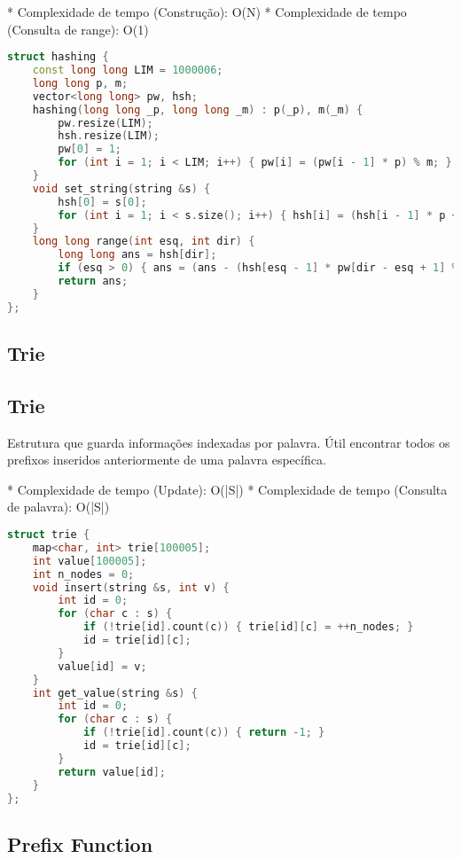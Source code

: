 \documentclass[11pt, a4paper, twoside]{article}
\begin{document}
* Complexidade de tempo (Construção): O(N)
* Complexidade de tempo (Consulta de range): O(1)

\begin{lstlisting}[language=C++]
struct hashing {
    const long long LIM = 1000006;
    long long p, m;
    vector<long long> pw, hsh;
    hashing(long long _p, long long _m) : p(_p), m(_m) {
        pw.resize(LIM);
        hsh.resize(LIM);
        pw[0] = 1;
        for (int i = 1; i < LIM; i++) { pw[i] = (pw[i - 1] * p) % m; }
    }
    void set_string(string &s) {
        hsh[0] = s[0];
        for (int i = 1; i < s.size(); i++) { hsh[i] = (hsh[i - 1] * p + s[i]) % m; }
    }
    long long range(int esq, int dir) {
        long long ans = hsh[dir];
        if (esq > 0) { ans = (ans - (hsh[esq - 1] * pw[dir - esq + 1] % m) + m) % m; }
        return ans;
    }
};
\end{lstlisting}

\subsection{Trie}

\subsection{Trie}



Estrutura que guarda informações indexadas por palavra.   
Útil encontrar todos os prefixos inseridos anteriormente de uma palavra específica.

* Complexidade de tempo (Update): O(|S|)
* Complexidade de tempo (Consulta de palavra): O(|S|)

\begin{lstlisting}[language=C++]
struct trie {
    map<char, int> trie[100005];
    int value[100005];
    int n_nodes = 0;
    void insert(string &s, int v) {
        int id = 0;
        for (char c : s) {
            if (!trie[id].count(c)) { trie[id][c] = ++n_nodes; }
            id = trie[id][c];
        }
        value[id] = v;
    }
    int get_value(string &s) {
        int id = 0;
        for (char c : s) {
            if (!trie[id].count(c)) { return -1; }
            id = trie[id][c];
        }
        return value[id];
    }
};
\end{lstlisting}

\subsection{Prefix Function}
\end{document}
